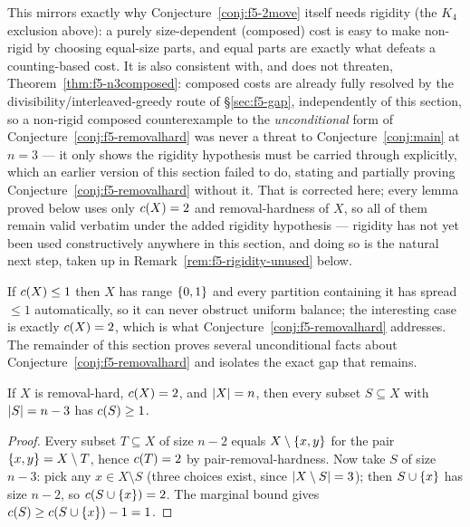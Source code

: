 This mirrors exactly why Conjecture~\ref{conj:f5-2move} itself needs rigidity
(the $K_4$ exclusion above): a purely size-dependent (composed) cost is easy to
make non-rigid by choosing equal-size parts, and equal parts are exactly what
defeats a counting-based cost. It is also consistent with, and does not
threaten, Theorem~\ref{thm:f5-n3composed}: composed costs are already fully
resolved by the divisibility/interleaved-greedy route of \S\ref{sec:f5-gap},
independently of this section, so a non-rigid composed counterexample to the
\emph{unconditional} form of Conjecture~\ref{conj:f5-removalhard} was never a
threat to Conjecture~\ref{conj:main} at $n=3$ --- it only shows the rigidity
hypothesis must be carried through explicitly, which an earlier version of
this section failed to do, stating and partially proving
Conjecture~\ref{conj:f5-removalhard} without it. That is corrected here; every
lemma proved below uses only $c(X)=2$ and removal-hardness of $X$, so all
of them remain valid verbatim under the added rigidity hypothesis --- rigidity
has not yet been used constructively anywhere in this section, and doing so is
the natural next step, taken up in Remark~\ref{rem:f5-rigidity-unused} below.

If $c(X) \le 1$ then $X$ has range $\left\{0,1\right\}$ and every partition
containing it has spread $\le 1$ automatically, so it can never obstruct
uniform balance; the interesting case is exactly $c(X) = 2$, which is what
Conjecture~\ref{conj:f5-removalhard} addresses. The remainder of this section
proves several unconditional facts about Conjecture~\ref{conj:f5-removalhard}
and isolates the exact gap that remains.

\begin{lemma}
\label{lem:f5-shadow}
If $X$ is removal-hard, $c(X) = 2$, and $\left\lvert X\right\rvert = n$, then every subset
$S \subseteq X$ with $\left\lvert S\right\rvert = n - 3$ has $c(S) \ge 1$.
\end{lemma}

\begin{proof}
Every subset $T \subseteq X$ of size $n-2$ equals $X \setminus \left\{x,y\right\}$ for
the pair $\left\{x,y\right\} = X \setminus T$, hence $c(T) = 2$ by
pair-removal-hardness. Now take $S$ of size $n-3$: pick any
$x \in X \setminus S$ (three choices exist, since $\left\lvert X \setminus S\right\rvert = 3$);
then $S \cup \left\{x\right\}$ has size $n-2$, so $c(S \cup \left\{x\right\}) = 2$. The
marginal bound gives $c(S) \ge c(S \cup \left\{x\right\}) - 1 = 1$.
\end{proof}

